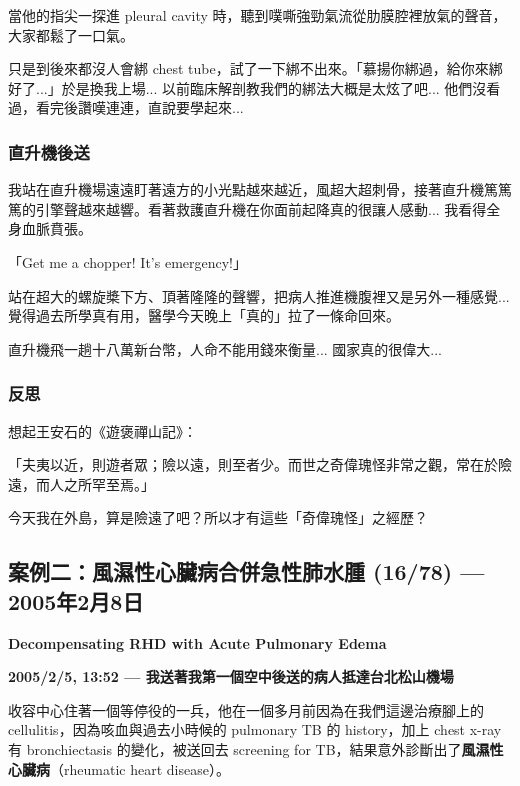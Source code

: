 \documentclass[12pt,a4paper]{article}
\newenvironment{myquote}{%
    \begin{tcolorbox}[
        colback=quote_bg,
        colframe=emergency_gray,
        boxrule=0pt,
        leftrule=3pt,
        arc=0pt,
        left=10pt,
        right=10pt,
        top=8pt,
        bottom=8pt
    ]
    \itshape
}{%
    \end{tcolorbox}
}
\begin{document}
當他的指尖一探進 pleural cavity 時，聽到噗嘶強勁氣流從肋膜腔裡放氣的聲音，大家都鬆了一口氣。

只是到後來都沒人會綁 chest tube，試了一下綁不出來。「慕揚你綁過，給你來綁好了...」於是換我上場... 以前臨床解剖教我們的綁法大概是太炫了吧... 他們沒看過，看完後讚嘆連連，直說要學起來...

\subsubsection{直升機後送}

我站在直升機場遠遠盯著遠方的小光點越來越近，風超大超刺骨，接著直升機篤篤篤的引擎聲越來越響。看著救護直升機在你面前起降真的很讓人感動... 我看得全身血脈賁張。

\begin{myquote}
「Get me a chopper! It's emergency!」
\end{myquote}

站在超大的螺旋槳下方、頂著隆隆的聲響，把病人推進機腹裡又是另外一種感覺... 覺得過去所學真有用，醫學今天晚上「真的」拉了一條命回來。

直升機飛一趟十八萬新台幣，人命不能用錢來衡量... 國家真的很偉大...

\subsubsection{反思}

想起王安石的《遊褒禪山記》：

\begin{myquote}
「夫夷以近，則遊者眾；險以遠，則至者少。而世之奇偉瑰怪非常之觀，常在於險遠，而人之所罕至焉。」
\end{myquote}

今天我在外島，算是險遠了吧？所以才有這些「奇偉瑰怪」之經歷？

\subsection{案例二：風濕性心臟病合併急性肺水腫 (16/78) — 2005年2月8日}

\textbf{\large\color{emergency_blue} Decompensating RHD with Acute Pulmonary Edema}

\vspace{0.3cm}

\textbf{2005/2/5, 13:52 — 我送著我第一個空中後送的病人抵達台北松山機場}

收容中心住著一個等停役的一兵，他在一個多月前因為在我們這邊治療腳上的 cellulitis，因為咳血與過去小時候的 pulmonary TB 的 history，加上 chest x-ray 有 bronchiectasis 的變化，被送回去 screening for TB，結果意外診斷出了\textbf{風濕性心臟病}（rheumatic heart disease）。
\end{document}
